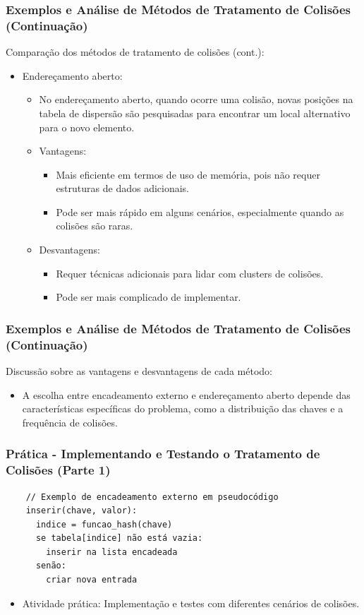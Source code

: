 \begin{frame}[fragile]
  \frametitle{Exemplos e Análise de Métodos de Tratamento de Colisões (Continuação)}
Comparação dos métodos de tratamento de colisões (cont.):
      \begin{itemize}
        \item Endereçamento aberto:
          \begin{itemize}
            \item No endereçamento aberto, quando ocorre uma colisão, novas posições na tabela de dispersão são pesquisadas para encontrar um local alternativo para o novo elemento.
            \item Vantagens:
              \begin{itemize}
                \item Mais eficiente em termos de uso de memória, pois não requer estruturas de dados adicionais.
                \item Pode ser mais rápido em alguns cenários, especialmente quando as colisões são raras.
              \end{itemize}
            \item Desvantagens:
              \begin{itemize}
                \item Requer técnicas adicionais para lidar com clusters de colisões.
                \item Pode ser mais complicado de implementar.
              \end{itemize}
          \end{itemize}
      \end{itemize}
\end{frame}

\begin{frame}[fragile]
  \frametitle{Exemplos e Análise de Métodos de Tratamento de Colisões (Continuação)}
  Discussão sobre as vantagens e desvantagens de cada método:
  \begin{itemize}
    \item A escolha entre encadeamento externo e endereçamento aberto 
    depende das características específicas do problema, como a 
    distribuição das chaves e a frequência de colisões.
  \end{itemize}
\end{frame}

\begin{frame}[fragile]
  \frametitle{Prática - Implementando e Testando o Tratamento de Colisões (Parte 1)}
  \begin{verbatim}
    // Exemplo de encadeamento externo em pseudocódigo
    inserir(chave, valor):
      indice = funcao_hash(chave)
      se tabela[indice] não está vazia:
        inserir na lista encadeada
      senão:
        criar nova entrada
  \end{verbatim}
  \begin{itemize}
    \item Atividade prática: Implementação e testes com diferentes cenários de colisões.
  \end{itemize}
\end{frame}

